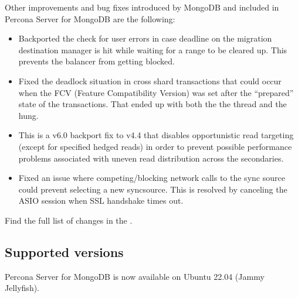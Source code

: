 \documentclass[letterpaper,10pt,english]{sphinxmanual}
\begin{document}
\sphinxAtStartPar
Other improvements and bug fixes introduced by MongoDB and included in Percona Server for MongoDB are the following:
\begin{itemize}
\item {} 
\sphinxAtStartPar
{} \sphinxhyphen{} Backported the check for user errors in case deadline on the migration destination manager is hit while waiting for a range to be cleared up. This prevents the balancer from getting blocked.

\item {} 
\sphinxAtStartPar
{} \sphinxhyphen{} Fixed the deadlock situation in cross shard transactions that could occur when the FCV (Feature Compatibility Version) was set after the “prepared” state of the transactions. That ended up with both the the  thread and the  hung.

\item {} 
\sphinxAtStartPar
{} \sphinxhyphen{} This is a v6.0 backport fix to v4.4 that disables opportunistic read targeting (except for specified hedged reads) in order to prevent possible performance problems associated with uneven read distribution across the secondaries.

\item {} 
\sphinxAtStartPar
{} \sphinxhyphen{} Fixed an issue where competing/blocking network calls to the sync source could prevent selecting a new sync\sphinxhyphen{}source. This is resolved by canceling the ASIO session when SSL handshake times out.

\end{itemize}

\sphinxAtStartPar
Find the full list of changes in the .


\subsection{Supported versions}
\label{\detokenize{release_notes/4.4.15-15:supported-versions}}
\sphinxAtStartPar
Percona Server for MongoDB is now available on Ubuntu 22.04 (Jammy Jellyfish).
\end{document}

